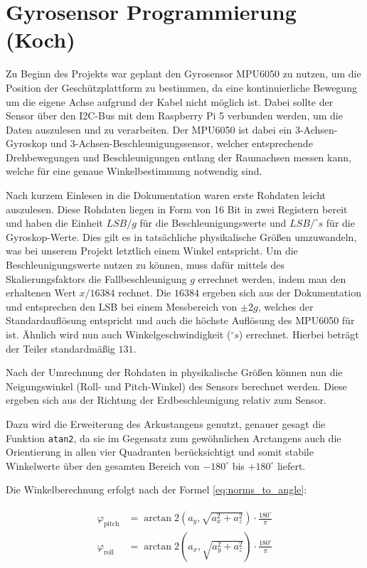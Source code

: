 \section{Gyrosensor Programmierung (Koch)}
Zu Beginn des Projekts war geplant den Gyrosensor MPU6050 zu nutzen, um die Position der Geschützplattform zu bestimmen, da eine kontinuierliche Bewegung um die eigene Achse aufgrund der Kabel nicht möglich ist. Dabei sollte der Sensor über den I2C-Bus mit dem Raspberry Pi 5 verbunden werden, um die Daten auszulesen und zu verarbeiten.
Der MPU6050 ist dabei ein 3-Achsen-Gyroskop und 3-Achsen-Beschleunigungssensor, welcher entsprechende Drehbewegungen und Beschleunigungen entlang der Raumachsen messen kann, welche für eine genaue Winkelbestimmung notwendig sind.

Nach kurzem Einlesen in die Dokumentation waren erste Rohdaten leicht auszulesen. Diese Rohdaten liegen in Form von 16 Bit in zwei Registern bereit und haben die Einheit $\mathit{LSB/g}$ für die Beschleunigungswerte und $\mathit{LSB/^\circ s}$ für die Gyroskop-Werte. Dies gilt es in tatsächliche physikalische Größen umzuwandeln, was bei unserem Projekt letztlich einem Winkel entspricht. 
Um die Beschleunigungswerte nutzen zu können, muss dafür mittels des Skalierungsfaktors die Fallbeschleunigung $\mathit{g}$ errechnet werden, indem man den erhaltenen Wert $x/16384$ rechnet. Die $16384$ ergeben sich aus der Dokumentation und entsprechen den LSB bei einem Messbereich von $\pm2g$, welches der Standardauflösung entspricht und auch die höchste Auflösung des MPU6050 für ist.
Ähnlich wird nun auch Winkelgeschwindigkeit ($\mathit{^\circ s}$) errechnet. Hierbei beträgt der Teiler standardmäßig $131$. \cite[S. 12-13]{raspberry_invensense_mpu6050_datasheet} 

Nach der Umrechnung der Rohdaten in physikalische Größen können nun die Neigungswinkel (Roll- und Pitch-Winkel) des Sensors berechnet werden. Diese ergeben sich aus der Richtung der Erdbeschleunigung relativ zum Sensor. 

Dazu wird die Erweiterung des Arkustangens genutzt, genauer gesagt die Funktion \texttt{atan2}, da sie im Gegensatz zum gewöhnlichen Arctangens auch die Orientierung in allen vier Quadranten berücksichtigt und somit stabile Winkelwerte über den gesamten Bereich von $-180^\circ$ bis $+180^\circ$ liefert. \cite{raspberry_matlab_atan2}

Die Winkelberechnung erfolgt nach der Formel \ref{eq:norms_to_angle}:

\begin{gather}
    \begin{aligned}
    \varphi_\text{pitch} &= \arctan2\left(a_y,\sqrt{a_x^2 + a_z^2}\right) \cdot \frac{180^\circ}{\pi} \\
    \varphi_\text{roll}  &= \arctan2\left(a_x,\sqrt{a_y^2 + a_z^2}\right) \cdot \frac{180^\circ}{\pi}
    \end{aligned}
    \label{eq:norms_to_angle}
\end{gather}


